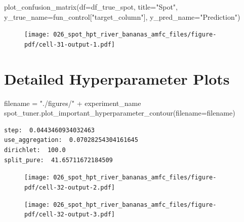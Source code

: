 \documentclass[
  letterpaper,
  DIV=11,
  numbers=noendperiod]{scrreprt}
\newenvironment{Shaded}{\begin{snugshade}}{\end{snugshade}}
\newcommand{\NormalTok}[1]{\textcolor[rgb]{0.00,0.23,0.31}{#1}}
\newcommand{\OperatorTok}[1]{\textcolor[rgb]{0.37,0.37,0.37}{#1}}
\newcommand{\StringTok}[1]{\textcolor[rgb]{0.13,0.47,0.30}{#1}}
\begin{document}
\begin{Shaded}
\begin{Highlighting}[]
\NormalTok{plot\_confusion\_matrix(df}\OperatorTok{=}\NormalTok{df\_true\_spot, title}\OperatorTok{=}\StringTok{"Spot"}\NormalTok{, y\_true\_name}\OperatorTok{=}\NormalTok{fun\_control[}\StringTok{"target\_column"}\NormalTok{], y\_pred\_name}\OperatorTok{=}\StringTok{"Prediction"}\NormalTok{)}
\end{Highlighting}
\end{Shaded}

\begin{figure}[H]

{\centering \texttt{[image: 026\_spot\_hpt\_river\_bananas\_amfc\_files/figure-pdf/cell-31-output-1.pdf]}

}

\end{figure}

\hypertarget{detailed-hyperparameter-plots-7}{%
\section{Detailed Hyperparameter
Plots}\label{detailed-hyperparameter-plots-7}}

\begin{Shaded}
\begin{Highlighting}[]
\NormalTok{filename }\OperatorTok{=} \StringTok{"./figures/"} \OperatorTok{+}\NormalTok{ experiment\_name}
\NormalTok{spot\_tuner.plot\_important\_hyperparameter\_contour(filename}\OperatorTok{=}\NormalTok{filename)}
\end{Highlighting}
\end{Shaded}

\begin{verbatim}
step:  0.0443460934032463
use_aggregation:  0.07028254304161645
dirichlet:  100.0
split_pure:  41.65711672184509
\end{verbatim}

\begin{figure}[H]

{\centering \texttt{[image: 026\_spot\_hpt\_river\_bananas\_amfc\_files/figure-pdf/cell-32-output-2.pdf]}

}

\end{figure}

\begin{figure}[H]

{\centering \texttt{[image: 026\_spot\_hpt\_river\_bananas\_amfc\_files/figure-pdf/cell-32-output-3.pdf]}

}

\end{figure}
\end{document}
